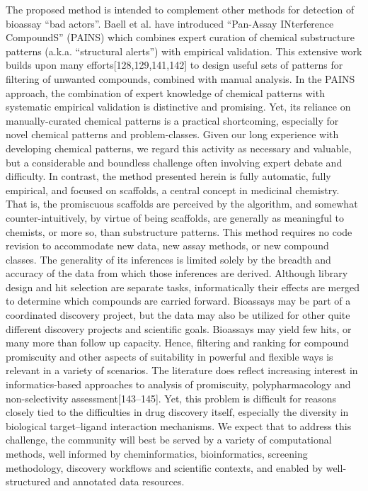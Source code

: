 The proposed method is intended to complement other methods for detection of bioassay “bad actors”. Baell et al. have introduced “Pan-Assay INterference CompoundS” (PAINS) which combines expert curation of chemical substructure patterns (a.k.a. “structural alerts”) with empirical validation. This extensive work builds upon many efforts[128,129,141,142] to design useful sets of patterns for filtering of unwanted compounds, combined with manual analysis. In the PAINS approach, the combination of expert knowledge of chemical patterns with systematic empirical validation is distinctive and promising. Yet, its reliance on manually-curated chemical patterns is a practical shortcoming, especially for novel chemical patterns and problem-classes. Given our long experience with developing chemical patterns, we regard this activity as necessary and valuable, but a considerable and boundless challenge often involving expert debate and difficulty. In contrast, the method presented herein is fully automatic, fully empirical, and focused on scaffolds, a central concept in medicinal chemistry. That is, the promiscuous scaffolds are perceived by the algorithm, and somewhat counter-intuitively, by virtue of being scaffolds, are generally as meaningful to chemists, or more so, than substructure patterns. This method requires no code revision to accommodate new data, new assay methods, or new compound classes. The generality of its inferences is limited solely by the breadth and accuracy of the data from which those inferences are derived.
Although library design and hit selection are separate tasks, informatically their effects are merged to determine which compounds are carried forward. Bioassays may be part of a coordinated discovery project, but the data may also be utilized for other quite different discovery projects and scientific goals. Bioassays may yield few hits, or many more than follow up capacity. Hence, filtering and ranking for compound promiscuity and other aspects of suitability in powerful and flexible ways is relevant in a variety of scenarios. The literature does reflect increasing interest in informatics-based approaches to analysis of promiscuity, polypharmacology and non-selectivity assessment[143–145]. Yet, this problem is difficult for reasons closely tied to the difficulties in drug discovery itself, especially the diversity in biological target–ligand interaction mechanisms. We expect that to address this challenge, the community will best be served by a variety of computational methods, well informed by cheminformatics, bioinformatics, screening methodology, discovery workflows and scientific contexts, and enabled by well-structured and annotated data resources.

